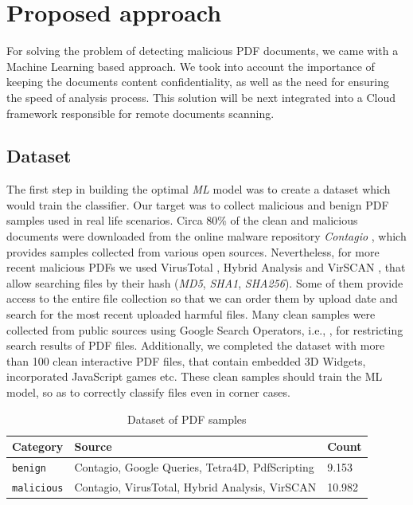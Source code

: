 \chapter{Proposed approach}
\label{chapter:proposedApproach}

For solving the problem of detecting malicious PDF documents, we came with a Machine Learning based approach. We took into account the importance of keeping the documents content confidentiality, as well as the need for ensuring the speed of analysis process. This solution will be next integrated into a Cloud framework responsible for remote documents scanning.

\section{Dataset}
\label{section:dataset}
The first step in building the optimal \textit{ML} model was to create a dataset which would train the classifier. Our target was to collect malicious and benign PDF samples used in real life scenarios. Circa 80\% of the clean and malicious documents were downloaded from the online malware repository \textit{Contagio} \cite{contagio}, which provides samples collected from various open sources. Nevertheless, for more recent malicious PDFs we used VirusTotal \cite{virustotal}, Hybrid Analysis \cite{hybridanalysis} and VirSCAN \cite{virscan}, that allow searching files by their hash (\textit{MD5}, \textit{SHA1}, \textit{SHA256}). Some of them provide access to the entire file collection so that we can order them by upload date and search for the most recent uploaded harmful files. Many clean samples were collected from public sources using Google Search Operators, i.e., , for restricting search results of PDF files. Additionally, we completed the dataset with more than 100 clean interactive PDF files, that contain embedded 3D Widgets, incorporated JavaScript games etc. These clean samples should train the ML model, so as to correctly classify files even in corner cases. 

\begin{table}[H]
	\caption{Dataset of PDF samples}
	\label{table:pdfSamples}
        \centering
            \begin{tabular}{p{2.5cm} p{9.5cm} p{1.5cm}}
                \toprule
                
				\textbf{Category} & \textbf{Source} & \textbf{Count} \\
				\hline 
                \texttt{benign} & Contagio, Google Queries, Tetra4D, PdfScripting  & 9.153 \\
                \hline
				\texttt{malicious} & Contagio, VirusTotal, Hybrid Analysis, VirSCAN & 10.982 \\
                
                \bottomrule
			\end{tabular}
\end{table}

